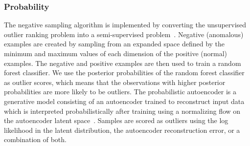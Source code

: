 \documentclass[utf8]{frontiersFPHY} %
\begin{document}
\subsubsection{Probability}
The negative sampling algorithm is implemented by converting the unsupervised 
outlier ranking problem into a semi-supervised 
problem~\citep{sipple:neg-sampling20}. Negative (anomalous) 
examples are created by sampling from an expanded space defined by the minimum 
and maximum values of each dimension of the positive (normal) examples. The 
negative and positive examples are then used to train a random forest 
classifier. We use the posterior probabilities of the random forest classifier 
as outlier scores, which means that the observations with higher posterior 
probabilities are more likely to be outliers.
The probabilistic autoencoder is a generative model consisting of an
autoencoder trained to reconstruct input data which is interpreted
probabilistically after training using a normalizing flow on the autoencoder
latent space~\cite{bohm2020probabilistic}.
Samples are scored as outliers using the log likelihood in the latent
distribution, the autoencoder reconstruction error, or a combination of
both.
\end{document}
